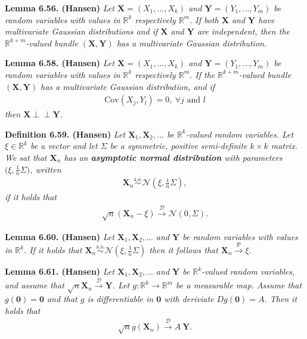 \documentclass[a4paper,12pt,openany]{book}
\begin{document}
\textbf{Lemma 6.56. (Hansen)} \emph{Let \(\mathbf{X}=(X_1,...,X_k)\) and \(\mathbf{Y}=(Y_1,...,Y_m)\) be random variables with values in \(\mathbb{R}^k\) respectively \(\mathbb{R}^m\). If both \(\mathbf{X}\) and \(\mathbf{Y}\) have multivariate Gaussian distributions and if \(\mathbf{X}\) and \(\mathbf{Y}\) are independent, then the \(\mathbb{R}^{k+m}\)-valued bundle \((\mathbf{X},\mathbf{Y})\) has a multivariate Gaussian distribution.}

\textbf{Lemma 6.58. (Hansen)} \emph{Let \(\mathbf{X}=(X_1,...,X_k)\) and \(\mathbf{Y}=(Y_1,...,Y_m)\) be random variables with values in \(\mathbb{R}^k\) respectively \(\mathbb{R}^m\). If the \(\mathbb{R}^{k+m}\)-valued bundle \((\mathbf{X},\mathbf{Y})\) has a multivariate Gaussian distribution, and if}
\begin{align*}
    \text{Cov}(X_j,Y_l)=0,\ \forall j\text{ and }l
\end{align*}
\emph{then \(\mathbf{X}\perp \!\!\! \perp\mathbf{Y}\).}

\textbf{Definition 6.59. (Hansen)} \emph{Let \(\mathbf{X}_1,\mathbf{X}_2,...\) be \(\mathbb{R}^k\)-valued random variables. Let \(\xi\in\mathbb{R}^k\) be a vector and let \(\Sigma\) be a symmetric, positive semi-definite \(k\times k\) matrix.}
\emph{We sat that \(\mathbf{X}_n\) has an \textbf{asymptotic normal distribution} with parameters \(\big(\xi,\frac{1}{n}\Sigma\big)\), written}
\begin{align*}
    \mathbf{X}_n\stackrel{\text{a.s.}}{\sim}\mathcal{N}\left(\xi,\frac{1}{n}\Sigma\right),
\end{align*}
\emph{if it holds that}
\begin{align*}
    \sqrt{n}(\mathbf{X}_n-\xi)\stackrel{\mathcal{D}}{\to} \mathcal{N}(0,\Sigma).
\end{align*}

\textbf{Lemma 6.60. (Hansen)} \emph{Let \(\mathbf{X}_1,\mathbf{X}_2,...\) and \(\mathbf{Y}\) be random variables with values in \(\mathbb{R}^k\). If it holds that \(\mathbf{X}_n\stackrel{\text{a.s.}}{\sim} \mathcal{N}(\xi,\frac{1}{n}\Sigma)\) then it follows that \(\mathbf{X}_n\stackrel{\text{P}}{\to}\xi\).}

\textbf{Lemma 6.61. (Hansen)} \emph{Let \(\mathbf{X}_1,\mathbf{X}_2,...\) and \(\mathbf{Y}\) be \(\mathbb{R}^k\)-valued random variables, and assume that \(\sqrt{n}\mathbf{X}_n\stackrel{\mathcal{D}}{\to} \mathbf{Y}\). Let \(g : \mathbb{R}^k\to \mathbb{R}^m\) be a measurable map. Assume that \(g(\mathbf{0})=\mathbf{0}\) and that \(g\) is differentiable in \(\mathbf{0}\) with deriviate \(Dg(\mathbf{0})=A\). Then it holds that}
\begin{align*}
    \sqrt{n}g(\mathbf{X}_n)\stackrel{\mathcal{D}}{\to} A\ \mathbf{Y}.
\end{align*}
\end{document}
